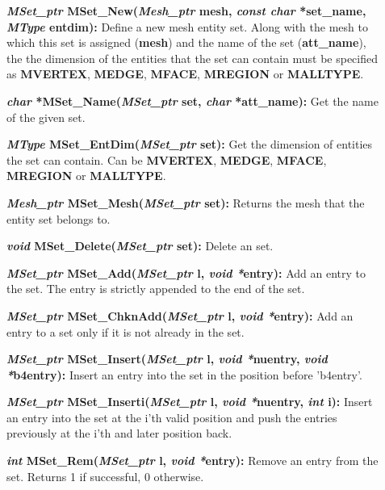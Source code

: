 \documentclass[12pt]{article}
\begin{document}
\begin{description}
  
\item[]{\bf {\em MSet\_ptr} MSet\_New({\em Mesh\_ptr} mesh, {\em const
      char} *set\_name, {\em MType} entdim):} Define a new mesh entity
  set. Along with the mesh to which this set is assigned ({\bf mesh})
  and the name of the set ({\bf att\_name}), the the dimension of the
  entities that the set can contain must be specified as {\bf
    MVERTEX}, {\bf MEDGE}, {\bf MFACE}, {\bf MREGION} or {\bf
    MALLTYPE}.

\item[]{\bf {\em char} *MSet\_Name({\em MSet\_ptr} set, {\em char}
    *att\_name):} Get the name of the given set.
  
\item[]{\bf {\em MType} MSet\_EntDim({\em MSet\_ptr} set):} Get the
  dimension of entities the set can contain. Can be {\bf MVERTEX},
  {\bf MEDGE}, {\bf MFACE}, {\bf MREGION} or {\bf MALLTYPE}.
  
\item[]{\bf {\em Mesh\_ptr} MSet\_Mesh({\em MSet\_ptr} set):}
Returns the mesh that the entity set belongs to.

\item[]{\bf {\em void} MSet\_Delete({\em MSet\_ptr} set):} Delete an
  set.

\item[]{\bf {\em MSet\_ptr} MSet\_Add({\em MSet\_ptr} l, {\em void
      *}entry):} Add an entry to the set. The entry is strictly
  appended to the end of the set.

\item[]{\bf {\em MSet\_ptr} MSet\_ChknAdd({\em MSet\_ptr} l, {\em void
      *}entry):} Add an entry to a set only if it is not already in
  the set.

\item[]{\bf {\em MSet\_ptr} MSet\_Insert({\em MSet\_ptr} l, {\em void
      *}nuentry, {\em void *}b4entry):} Insert an entry into the set
  in the position before 'b4entry'.

\item[]{\bf {\em MSet\_ptr} MSet\_Inserti({\em MSet\_ptr} l, {\em void
      *}nuentry, {\em int} i):} Insert an entry into the set at the
  i'th valid position and push the entries previously at the i'th and
  later position back.

\item[]{\bf {\em int} MSet\_Rem({\em MSet\_ptr} l, {\em void
      *}entry):} Remove an entry from the set. Returns 1 if
  successful, 0 otherwise.


\end{description}
\end{document}
